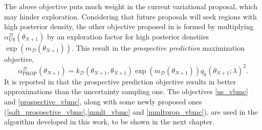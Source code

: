 The above objective puts much weight in the current variational proposal, which may hinder exploration. Considering that future proposals will seek regions with high posterior density, the other objective proposed in \cite{Acerbi_2018} is formed by multiplying $\alpha^\mathcal{D}_{\text{US}}(\theta_{N+1})$ by an exploration factor for high posterior denstiies  $\exp(m_\mathcal{D}(\theta_{N+1}))$. This result in the \textit{prospective prediction} maximization objective,
\begin{equation}\label{prospective_vbmc}
\alpha^\mathcal{D}_{\text{PROP}}(\theta_{N+1}) = k_\mathcal{D}(\theta_{N+1},\theta_{N+1}) \exp(m_\mathcal{D}(\theta_{N+1}))q_k(\theta_{N+1};\lambda)^2.
\end{equation}
It is reported in \cite{Acerbi_2018} that the prospective prediction objective results in better approximations than the uncertainty sampling one. The objectives \eqref{us_vbmc} and \eqref{prospective_vbmc}, along with some newly proposed ones (\eqref{soft_prospective_vbmc},\eqref{mmlt_vbmc} and \eqref{mmltprop_vbmc}), are used in the algorithm developed in this work, to be shown in the next chapter.




